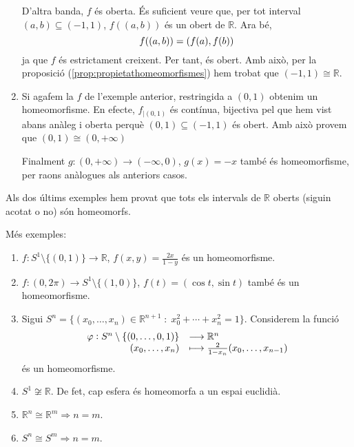 \documentclass[../main.tex]{subfiles}
\begin{document}
\begin{ej}
\begin{enumerate}[(1)]
    D'altra banda, $f$ és oberta. És suficient veure que, per tot interval $(a,b)\subseteq (-1,1)$, $f((a,b))$ és un obert de $\mathbb{R}$. Ara bé,
    \begin{equation}
        \notag
        f((a,b)) = (f(a),f(b))
    \end{equation}
    ja que $f$ és estrictament creixent. Per tant, és obert. Amb això, per la proposició (\ref{prop:propietathomeomorfismes}) hem trobat que $(-1,1)\cong \mathbb{R}$.
    
    \item Si agafem la $f$ de l'exemple anterior, restringida a $(0,1)$ obtenim un homeomorfisme. En efecte, $f_{|(0,1)}$ és contínua, bijectiva pel que hem vist abans anàleg i oberta perquè $(0,1)\subseteq (-1,1)$ és obert. Amb això provem que $(0,1)\cong (0,+\infty)$
    
    Finalment $g:(0,+\infty)\rightarrow(-\infty,0)$, $g(x) = -x$ també és homeomorfisme, per raons anàlogues als anteriors casos.
\end{enumerate}
\end{ej}

\begin{nota}
\label{nota:intervalsobertssonhomeomorfs} Als dos últims exemples hem provat que tots els intervals de $\mathbb{R}$ oberts (siguin acotat o no) són homeomorfs.
\end{nota}

\begin{ej}
\label{ej:homeomorfismes2} Més exemples:
\begin{enumerate}[(1)]
    \item $f:S^1\setminus\{(0,1)\}\rightarrow\mathbb{R}$, $f(x,y) = \frac{2x}{1-y}$ és un homeomorfisme.
    \item $f:(0,2\pi)\rightarrow S^1\setminus\{(1,0)\}$, $f(t) = (\cos t,\sin t)$ també és un homeomorfisme.
    \item Sigui $S^n = \{(x_0,\ldots,x_n)\in\mathbb{R}^{n+1}\;:\;x_0^2+\cdots+x_n^2 = 1\}$. Considerem la funció
    \begin{equation}
        \notag
        \begin{array}{rl}
            \varphi:S^n\setminus\{(0,\ldots,0,1)\} & \longrightarrow \mathbb{R}^n \\
            (x_0,\ldots,x_n) & \longmapsto \frac{2}{1-x_n}(x_0,\ldots,x_{n-1})
        \end{array}
    \end{equation}
    és un homeomorfisme.
    
    \item $S^1\not\cong\mathbb{R}$. De fet, cap esfera és homeomorfa a un espai euclidià.
    \item $\mathbb{R}^n\cong\mathbb{R}^m\Longrightarrow n=m$.
    \item $S^n\cong S^m\Longrightarrow n=m$.
\end{enumerate}
\end{ej}
\end{document}
